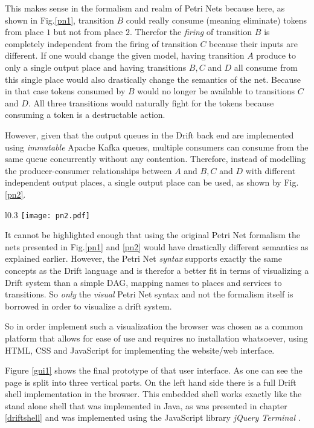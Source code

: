 This makes sense in the formalism and realm of Petri Nets because
here, as shown in Fig.\ref{pn1}, transition $B$ could really consume
(meaning eliminate) tokens from place $1$ but not from place $2$.
Therefor the \textit{firing} of transition $B$ is completely
independent from the firing of transition $C$ because their inputs
are different. If one would change the given model, having transition
$A$ produce to only a single output place and having transitions
$B, C$ and $D$ all consume from this single place would also
drastically change the semantics of the net. Because in that case
tokens consumed by $B$ would no longer be available to transitions
$C$ and $D$. All three transitions would naturally fight for the
tokens because consuming a token is a destructable action.
\newline

However, given that the output queues in the Drift back end
are implemented using \textit{immutable} Apache Kafka queues, multiple
consumers can consume from the same queue concurrently without
any contention. Therefore, instead of modelling the
producer-consumer relationships between $A$ and $B, C$ and $D$
with different independent output places, a single output
place can be used, as shown by Fig.\ref{pn2}.

\begin{wrapfigure}{l}{0.3\textwidth}
  \texttt{[image: pn2.pdf]}
  \caption{Minimized net with \textit{different} semantics.}
  \label{pn2}
\end{wrapfigure}

It cannot be highlighted enough that using the original Petri Net
formalism the nets presented in Fig.\ref{pn1} and \ref{pn2} would
have drastically different semantics as explained earlier.
However, the Petri Net \textit{syntax} supports exactly the
same concepts as the Drift language and is therefor a better fit in terms
of visualizing a Drift system than a simple DAG, mapping names
to places and services to transitions. So \textit{only} the
\textit{visual} Petri Net syntax and not the
formalism itself is borrowed in order to visualize a drift system.

So in order implement such a visualization the browser was chosen
as a common platform that allows for ease of use and requires no
installation whatsoever, using HTML, CSS and JavaScript for
implementing the website/web interface.

Figure \ref{gui1} shows the final prototype of that user interface.
As one can see the page is split into three vertical parts. On the left
hand side there is a full Drift shell implementation in the
browser. This embedded shell works exactly like the stand alone
shell that was implemented in Java, as was presented in chapter
\ref{driftshell} and was implemented using the JavaScript
library \textit{jQuery Terminal} \cite{jqueryterminaljs}.

